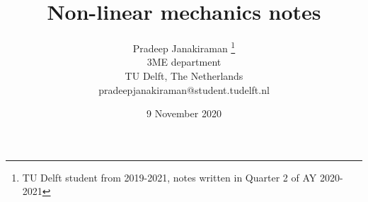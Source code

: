 \documentclass[a4paper, reqno, 12pt, openbib]{article} %
\begin{document}
\title{Non-linear mechanics notes}
\author{Pradeep Janakiraman \thanks{TU Delft student from 2019-2021, notes written in Quarter 2 of AY 2020-2021}\\
3ME department\\
TU Delft, The Netherlands\\
pradeepjanakiraman@student.tudelft.nl}
\date{9 November 2020}
\maketitle
\newpage
\tableofcontents
\newpage


\end{document}
